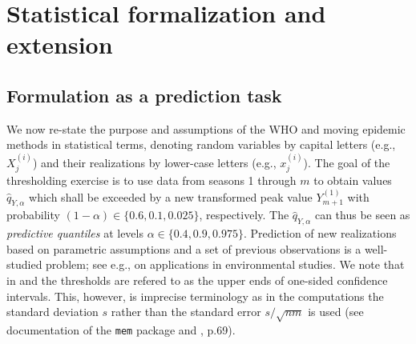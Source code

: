 \documentclass[12pt]{article}
\newcommand{\sd}{s}
\begin{document}
\section{Statistical formalization and extension}
\label{sec:formalization_extension}

\subsection{Formulation as a prediction task}
\label{subsec:reformulation}

We now re-state the purpose and assumptions of the WHO and moving epidemic methods in statistical terms, denoting random variables by capital letters (e.g., $X_j^{(i)}$) and their realizations by lower-case letters (e.g., $x_j^{(i)}$). The goal of the thresholding exercise is to use data from seasons 1 through $m$ to obtain values $\hat{q}_{Y, \alpha}$ which shall be exceeded by a new transformed peak value $Y_{m + 1}^{(1)}$ with probability $(1 - \alpha) \in \{0.6, 0.1, 0.025\}$, respectively. The $\hat{q}_{Y, \alpha}$ can thus be seen as \textit{predictive quantiles} at levels $\alpha \in \{0.4, 0.9, 0.975\}$. Prediction of new realizations based on parametric assumptions and a set of previous observations is a well-studied problem; see e.g., \cite{Millard2013} on applications in environmental studies. We note that in \cite{WHO2014} and \cite{Vega2015} the thresholds are refered to as the upper ends of one-sided confidence intervals. This, however, is imprecise terminology as in the computations the standard deviation $\sd$ rather than the standard error $\sd/\sqrt{nm}$ is used (see documentation of the \texttt{mem} package and \citealt{WHO2014}, p.69).
\end{document}

